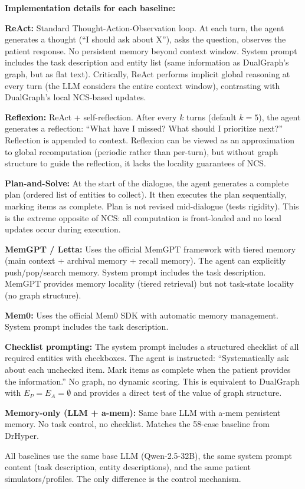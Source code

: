 \documentclass[11pt,a4paper]{article}
\newcommand{\placeholder}[1]{%
  \begin{tcolorbox}[colback=yellow!10,colframe=orange!60!black,
    fonttitle=\bfseries,title=Placeholder]
    #1
  \end{tcolorbox}%
}
\begin{document}
\placeholder{%
  \textbf{Implementation details for each baseline:}

  \textbf{ReAct:} Standard Thought-Action-Observation loop. At each turn,
  the agent generates a thought (``I should ask about X''), asks the
  question, observes the patient response. No persistent memory beyond
  context window. System prompt includes the task description and entity
  list (same information as DualGraph's graph, but as flat text). Critically,
  ReAct performs implicit global reasoning at every turn (the LLM considers
  the entire context window), contrasting with DualGraph's local NCS-based
  updates.

  \textbf{Reflexion:} ReAct + self-reflection. After every $k$ turns
  (default $k=5$), the agent generates a reflection: ``What have I missed?
  What should I prioritize next?'' Reflection is appended to context.
  Reflexion can be viewed as an approximation to global recomputation
  (periodic rather than per-turn), but without graph structure to guide
  the reflection, it lacks the locality guarantees of NCS.

  \textbf{Plan-and-Solve:} At the start of the dialogue, the agent generates
  a complete plan (ordered list of entities to collect). It then executes
  the plan sequentially, marking items as complete. Plan is not revised
  mid-dialogue (tests rigidity). This is the extreme opposite of NCS:
  all computation is front-loaded and no local updates occur during
  execution.

  \textbf{MemGPT / Letta:} Uses the official MemGPT framework with tiered
  memory (main context + archival memory + recall memory). The agent can
  explicitly push/pop/search memory. System prompt includes the task
  description. MemGPT provides memory locality (tiered retrieval) but not
  task-state locality (no graph structure).

  \textbf{Mem0:} Uses the official Mem0 SDK with automatic memory
  management. System prompt includes the task description.

  \textbf{Checklist prompting:} The system prompt includes a structured
  checklist of all required entities with checkboxes. The agent is
  instructed: ``Systematically ask about each unchecked item. Mark items
  as complete when the patient provides the information.'' No graph, no
  dynamic scoring. This is equivalent to DualGraph with $E_P = E_A =
  \emptyset$ and provides a direct test of the value of graph structure.

  \textbf{Memory-only (LLM + a-mem):} Same base LLM with a-mem persistent
  memory. No task control, no checklist. Matches the 58-case baseline from
  DrHyper.

  All baselines use the same base LLM (Qwen-2.5-32B), the same system
  prompt content (task description, entity descriptions), and the same
  patient simulators/profiles. The only difference is the control mechanism.
}
\end{document}
